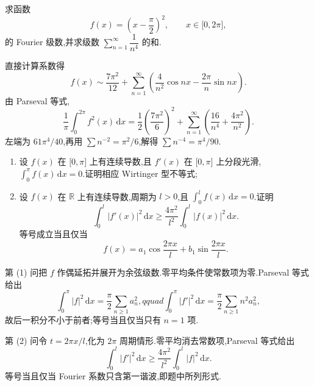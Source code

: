 \begin{example}
    求函数
    \[
        f(x)=\left(x-\dfrac{\pi}{2}\right)^2,
        \qquad x\in\lbrack 0,2\pi\rbrack,
    \]
    的 Fourier 级数,并求级数 $\displaystyle\sum\limits_{n=1}^{\infty}\dfrac{1}{n^4}$ 的和.
\end{example}
\exampleblank

\begin{solution}
    直接计算系数得
    \[
        f(x)\sim\dfrac{7\pi^2}{12}+
        \sum\limits_{n=1}^{\infty}\left(\dfrac{4}{n^2}\cos nx-\dfrac{2\pi}{n}\sin nx\right).
    \]
    由 Parseval 等式,
    \[
        \dfrac{1}{\pi}\int_0^{2\pi}f^2(x)\,\mathrm{d}x
        =\dfrac{1}{2}\left(\dfrac{7\pi^2}{6}\right)^2
        +\sum\limits_{n=1}^{\infty}\left(\dfrac{16}{n^4}+\dfrac{4\pi^2}{n^2}\right).
    \]
    左端为 $61\pi^4/40$,再用 $\sum n^{-2}=\pi^2/6$,解得
    $\sum n^{-4}=\pi^4/90$.
\end{solution}

\begin{example}
    \begin{enumerate}
        \item 设 $f(x)$ 在 $\lbrack 0,\pi\rbrack$ 上有连续导数,且 $f'(x)$ 在 $\lbrack 0,\pi\rbrack$ 上分段光滑,$\displaystyle\int_0^\pi f(x)\,\mathrm{d}x=0$.证明相应 Wirtinger 型不等式;
        \item 设 $f(x)$ 在 $\mathbb R$ 上有连续导数,周期为 $l>0$,且 $\displaystyle\int_0^lf(x)\,\mathrm{d}x=0$.证明
              \[
                  \int_0^l|f'(x)|^2\,\mathrm{d}x
                  \geq\dfrac{4\pi^2}{l^2}\int_0^l|f(x)|^2\,\mathrm{d}x.
              \]
              等号成立当且仅当
              \[
                  f(x)=a_1\cos\dfrac{2\pi x}{l}+b_1\sin\dfrac{2\pi x}{l}.
              \]
    \end{enumerate}
\end{example}
\exampleblank

\begin{solution}
    第 (1) 问把 $f$ 作偶延拓并展开为余弦级数.零平均条件使常数项为零.Parseval 等式给出
    \[
        \int_0^\pi|f|^2\,\mathrm{d}x=\dfrac{\pi}{2}\sum\limits_{n\geq1}a_n^2,qquad
        \int_0^\pi|f'|^2\,\mathrm{d}x=\dfrac{\pi}{2}\sum\limits_{n\geq1}n^2a_n^2,
    \]
    故后一积分不小于前者;等号当且仅当只有 $n=1$ 项.

    第 (2) 问令 $t=2\pi x/l$,化为 $2\pi$ 周期情形.零平均消去常数项,Parseval 等式给出
    \[
        \int_0^l|f'|^2\,\mathrm{d}x\geq\dfrac{4\pi^2}{l^2}
        \int_0^l|f|^2\,\mathrm{d}x.
    \]
    等号当且仅当 Fourier 系数只含第一谐波,即题中所列形式.
\end{solution}
